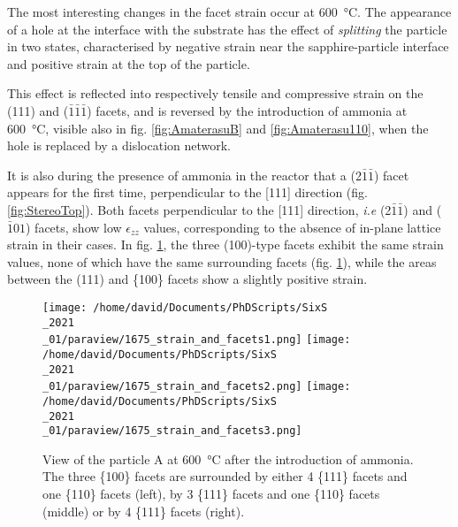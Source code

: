 The most interesting changes in the facet strain occur at \qty{600}{\degreeCelsius}.
The appearance of a hole at the interface with the substrate has the effect of \textit{splitting} the particle in two states, characterised by negative strain near the sapphire-particle interface and positive strain at the top of the particle.

This effect is reflected into respectively tensile and compressive strain on the (111) and ($\bar{1}\bar{1}\bar{1}$) facets, and is reversed by the introduction of ammonia at \qty{600}{\degreeCelsius}, visible also in fig. \ref{fig:AmaterasuB} and \ref{fig:Amaterasu110}, when the hole is replaced by a dislocation network.

It is also during the presence of ammonia in the reactor that a (2$\bar{1}\bar{1}$) facet appears for the first time, perpendicular to the [111] direction (fig. \ref{fig:StereoTop}).
Both facets perpendicular to the [111] direction, \textit{i.e} (2$\bar{1}\bar{1}$) and ($\bar{1}01$) facets, show low $\epsilon_{zz}$ values, corresponding to the absence of in-plane lattice strain in their cases.
In fig. \ref{fig:AmaterasuStrain1675}, the three (100)-type facets exhibit the same strain values, none of which have the same surrounding facets (fig. \ref{fig:AmaterasuStrain1675}), while the areas between the (111) and \{100\} facets show a slightly positive strain.

\begin{figure}[!htb]
    \centering
    \texttt{[image: /home/david/Documents/PhDScripts/SixS\\\_2021\\\_01/paraview/1675\_strain\_and\_facets1.png]}
    \texttt{[image: /home/david/Documents/PhDScripts/SixS\\\_2021\\\_01/paraview/1675\_strain\_and\_facets2.png]}
    \texttt{[image: /home/david/Documents/PhDScripts/SixS\\\_2021\\\_01/paraview/1675\_strain\_and\_facets3.png]}
    \caption{
        View of the particle A at \qty{600}{\degreeCelsius} after the introduction of ammonia.
        The three \{100\} facets are surrounded by either 4 \{111\} facets and one \{110\} facets (left), by 3 \{111\} facets and one \{110\} facets (middle) or by 4 \{111\} facets (right).
    }
    \label{fig:AmaterasuStrain1675}
\end{figure}

